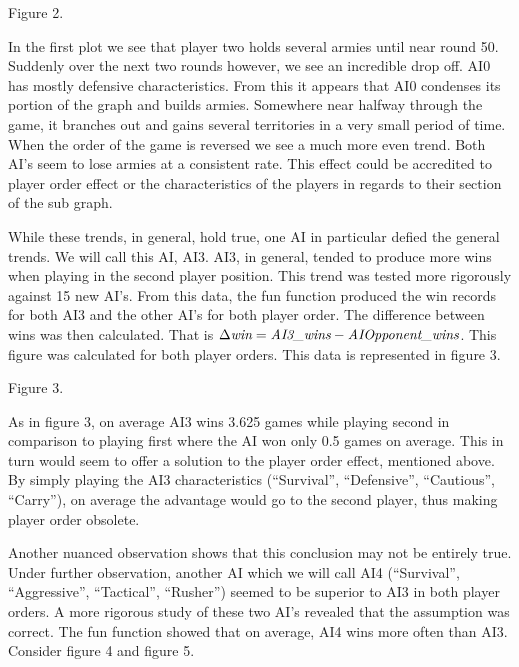 \documentclass[12pt]{article}  %
\begin{document}
\begin{center}
{\footnotesize Figure 2.}
\end{center}

In the first plot we see that player two holds several armies until near round 50. Suddenly over the next two rounds however, we see an incredible drop off. AI0 has mostly defensive characteristics. From this it appears that AI0 condenses its portion of the graph and builds armies. Somewhere near halfway through the game, it branches out and gains several territories in a very small period of time. When the order of the game is reversed we see a much more even trend. Both AI’s seem to lose armies at a consistent rate. This effect could be accredited to player order effect or the characteristics of the players in regards to their section of the sub graph. 


While these trends, in general, hold true, one AI in particular defied the general trends. We will call this AI, AI3. AI3, in general, tended to produce more wins when playing in the second player position. This trend was tested more rigorously against 15 new AI’s. From this data, the fun function produced the win records for both AI3 and the other AI’s for both player order. The difference between wins was then calculated. That is $\Delta \emph{win} = \emph{AI3\_wins} - \emph{AIOpponent\_wins}$. This figure was calculated for both player orders. This data is represented in figure 3.



\begin{center}
{\footnotesize Figure 3.}
\end{center}


As in figure 3, on average AI3 wins 3.625 games while playing second in comparison to playing first where the AI won only 0.5 games on average. This in turn would seem to offer a solution to the player order effect, mentioned above. By simply playing the AI3 characteristics (“Survival”, “Defensive”, “Cautious”, “Carry”), on average the advantage would go to the second player, thus making player order obsolete. 


Another nuanced observation shows that this conclusion may not be entirely true. Under further observation, another AI which we will call AI4 (“Survival”, “Aggressive”, “Tactical”, “Rusher”) seemed to be superior to AI3 in both player orders. A more rigorous study of these two AI’s revealed that the assumption was correct. The fun function showed that on average, AI4 wins more often than AI3. Consider figure 4 and figure 5. 
\end{document}
